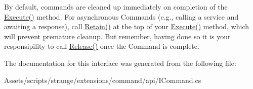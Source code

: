 By default, commands are cleaned up immediately on completion of the {\ttfamily \hyperlink{interfacestrange_1_1extensions_1_1command_1_1api_1_1_i_command_a49ddf3bbaf19624534fa99fa4725feca}{Execute()}} method. For asynchronous Commands (e.\-g., calling a service and awaiting a response), call {\ttfamily \hyperlink{interfacestrange_1_1extensions_1_1command_1_1api_1_1_i_command_ae24532aa617e2bee62a3798b59b78458}{Retain()}} at the top of your {\ttfamily \hyperlink{interfacestrange_1_1extensions_1_1command_1_1api_1_1_i_command_a49ddf3bbaf19624534fa99fa4725feca}{Execute()}} method, which will prevent premature cleanup. But remember, having done so it is your responsipility to call {\ttfamily \hyperlink{interfacestrange_1_1extensions_1_1command_1_1api_1_1_i_command_a462054fd8e17e6139f9739e32d4d6ced}{Release()}} once the Command is complete. 

The documentation for this interface was generated from the following file\-:\begin{DoxyCompactItemize}
\item 
Assets/scripts/strange/extensions/command/api/I\-Command.\-cs\end{DoxyCompactItemize}
